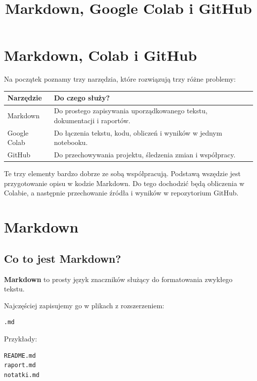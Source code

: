 \documentclass[12pt,a4paper]{article}
\title{\textbf{Markdown, Google Colab i GitHub}}
\author{}
\date{}
\begin{document}
\maketitle

\section{Markdown, Colab i GitHub}

Na początek poznamy trzy narzędzia, które rozwiązują trzy różne problemy:

\begin{table}[H]
\centering
\begin{tabular}{ll}
\toprule
\textbf{Narzędzie} & \textbf{Do czego służy?} \\
\midrule
Markdown & Do prostego zapisywania uporządkowanego tekstu, dokumentacji i raportów. \\
Google Colab & Do łączenia tekstu, kodu, obliczeń i wyników w jednym notebooku. \\
GitHub & Do przechowywania projektu, śledzenia zmian i współpracy. \\
\bottomrule
\end{tabular}
\end{table}

Te trzy elementy bardzo dobrze ze sobą współpracują. Podstawą wszędzie jest przygotowanie opisu w kodzie Markdown. Do tego dochodzić będą obliczenia w Colabie, a następnie przechowanie źródła i wyników w repozytorium GitHub.

\section{Markdown}

\subsection{Co to jest Markdown?}

\textbf{Markdown} to prosty język znaczników służący do formatowania zwykłego tekstu.

Najczęściej zapisujemy go w plikach z rozszerzeniem:

\begin{lstlisting}
.md
\end{lstlisting}

Przykłady:

\begin{lstlisting}
README.md
raport.md
notatki.md
\end{lstlisting}
\end{document}
